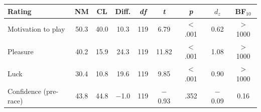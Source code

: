 \begin{tabular}{lcccccccc}
\toprule
Rating & NM & CL & Diff. & \textit{df} & \textit{t} & \textit{p} & $d_z$ & BF$_{10}$ \\
\midrule
Motivation to play & 50.3 & 40.0 & 10.3 & 119 & 6.79 & $<$ .001 & 0.62 & > 1000 \\
Pleasure & 40.2 & 15.9 & 24.3 & 119 & 11.82 & $<$ .001 & 1.08 & > 1000 \\
Luck & 30.4 & 10.8 & 19.6 & 119 & 9.85 & $<$ .001 & 0.90 & > 1000 \\
Confidence (pre-race) & 43.8 & 44.8 & $-$1.0 & 119 & $-$0.93 & .352 & $-$0.09 & 0.16 \\
\bottomrule
\end{tabular}
